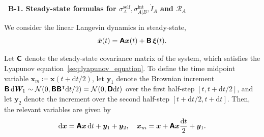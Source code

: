 \bigskip
\noindent\textbf{\textbullet\ B-1. Steady-state formulas for $\sigma_A^{\mathrm{self}},\sigma_{A|B}^{\mathrm{int}},\dot I_A$ and $\mathcal R_A$}

We consider the linear Langevin dynamics in steady-state,
\begin{equation*}
    \dot{\bm{x}}(t)=\boldsymbol{\mathsf{A}}\bm{x}(t)+\boldsymbol{\mathsf{B}}\,\bm{\xi}(t).
\end{equation*}

Let $\boldsymbol{\mathsf{C}}$ denote the steady-state covariance matrix of the system, which satisfies the Lyapunov equation~\eqref{seq:lyapunov_equation}.
To define the time midpoint variable $\bm x_m\coloneq \bm x(t+\mathrm{d}t/2)$, let $\bm y_1$ denote the Brownian increment $\boldsymbol{\mathsf{B}}\,\mathrm{d}\bm W_1\sim\mathcal{N}(0,\boldsymbol{\mathsf{B}}\boldsymbol{\mathsf{B}}^\intercal\mathrm dt/2)=\mathcal{N}(0,\boldsymbol{\mathsf{D}}\mathrm{d}t)$ over the first half-step $[t,t+\mathrm{d}t/2]$, and let $\bm y_2$ denote the increment over the second half-step $[t+\mathrm dt/2,t+\mathrm dt]$. Then, the relevant variables are given by
\[
    \mathrm{d}\bm x=\boldsymbol{\mathsf{A}}\bm x\,\mathrm{d}t+\bm y_1+\bm y_2,
    \quad
    \bm x_m=\bm x+\boldsymbol{\mathsf{A}}\bm x\frac{\mathrm{d}t}{2}+\bm y_1.
\]

